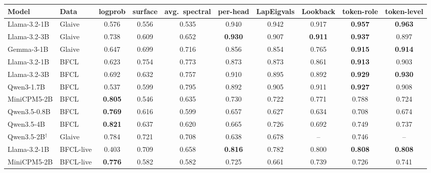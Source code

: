 \begin{tabular}{llcccccccc}
\toprule
Model & Data & logprob & surface & avg.\ spectral & per-head & LapEigvals & Lookback & token-role & token-level \\
\midrule
Llama-3.2-1B & Glaive & 0.576 & 0.556 & 0.535 & 0.940 & 0.942 & 0.917 & \textbf{0.957} & \textbf{0.963} \\
Llama-3.2-3B & Glaive & 0.738 & 0.609 & 0.652 & \textbf{0.930} & 0.907 & \textbf{0.911} & \textbf{0.937} & 0.897 \\
Gemma-3-1B & Glaive & 0.647 & 0.699 & 0.716 & 0.856 & 0.854 & 0.765 & \textbf{0.915} & \textbf{0.914} \\
Llama-3.2-1B & BFCL & 0.623 & 0.754 & 0.773 & 0.873 & 0.873 & 0.861 & \textbf{0.913} & 0.903 \\
Llama-3.2-3B & BFCL & 0.692 & 0.632 & 0.757 & 0.910 & 0.895 & 0.892 & \textbf{0.929} & \textbf{0.930} \\
Qwen3-1.7B & BFCL & 0.537 & 0.599 & 0.795 & 0.892 & 0.905 & 0.911 & \textbf{0.927} & 0.908 \\
MiniCPM5-2B & BFCL & \textbf{0.805} & 0.546 & 0.635 & 0.730 & 0.722 & 0.771 & 0.788 & 0.724 \\
Qwen3.5-0.8B & BFCL & \textbf{0.769} & 0.616 & 0.599 & 0.657 & 0.627 & 0.634 & 0.708 & 0.674 \\
Qwen3.5-4B & BFCL & \textbf{0.821} & 0.637 & 0.620 & 0.665 & 0.726 & 0.692 & 0.749 & 0.737 \\
Qwen3.5-2B$^\dagger$ & Glaive & 0.784 & 0.721 & 0.708 & 0.638 & 0.678 & -- & 0.746 & -- \\
Llama-3.2-1B & BFCL-live & 0.403 & 0.709 & 0.658 & \textbf{0.816} & 0.782 & 0.800 & \textbf{0.808} & \textbf{0.808} \\
MiniCPM5-2B & BFCL-live & \textbf{0.776} & 0.582 & 0.582 & 0.725 & 0.661 & 0.739 & 0.726 & 0.741 \\
\bottomrule
\end{tabular}
